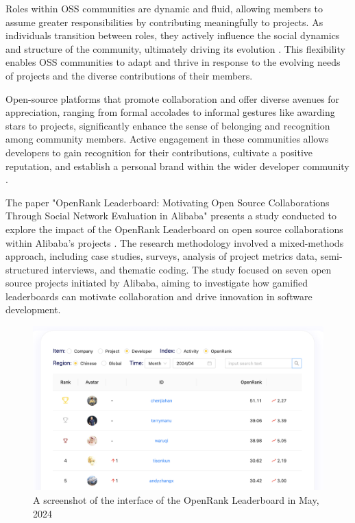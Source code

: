 Roles within OSS communities are dynamic and fluid, allowing members to assume greater responsibilities by contributing meaningfully to projects. As individuals transition between roles, they actively influence the social dynamics and structure of the community, ultimately driving its evolution \cite{06ye2003toward}. This flexibility enables OSS communities to adapt and thrive in response to the evolving needs of projects and the diverse contributions of their members.


Open-source platforms that promote collaboration and offer diverse avenues for appreciation, ranging from formal accolades to informal gestures like awarding stars to projects, significantly enhance the sense of belonging and recognition among community members. Active engagement in these communities allows developers to gain recognition for their contributions, cultivate a positive reputation, and establish a personal brand within the wider developer community \cite{11gerosa2021shifting,13li2012leadership}.

The paper "OpenRank Leaderboard: Motivating Open Source Collaborations Through Social Network Evaluation in Alibaba" presents a study conducted to explore the impact of the OpenRank Leaderboard on open source collaborations within Alibaba's projects \cite{07zhao2024openrank}. The research methodology involved a mixed-methods approach, including case studies, surveys, analysis of project metrics data, semi-structured interviews, and thematic coding. The study focused on seven open source projects initiated by Alibaba, aiming to investigate how gamified leaderboards can motivate collaboration and drive innovation in software development.

\begin{figure}[ht]
    \centering
    \includegraphics[width=0.85\linewidth]{figs/openrank.png}
    \caption{A screenshot of the interface of the OpenRank Leaderboard in May, 2024}
    \label{fig:openrank}
\end{figure}



